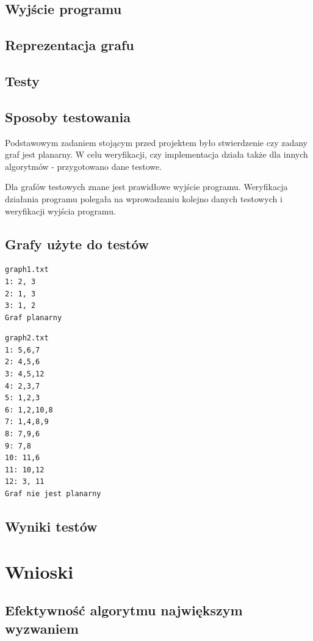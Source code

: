 \documentclass[a4 122pt]{article}
\begin{document}
	\subsection{Wyjście programu}

	\subsection{Reprezentacja grafu}

\subsection{Testy}

	\subsection{Sposoby testowania}

		Podstawowym zadaniem stojącym przed projektem było stwierdzenie czy zadany graf jest planarny.
		W celu weryfikacji, czy implementacja działa także dla innych algorytmów - przygotowano dane testowe.
		
		Dla grafów testowych znane jest prawidłowe wyjście programu. Weryfikacja działania programu polegała na wprowadzaniu kolejno danych testowych i weryfikacji wyjścia programu.		

	\subsection{Grafy użyte do testów}

\begin{verbatim}
graph1.txt
1: 2, 3
2: 1, 3
3: 1, 2
Graf planarny
\end{verbatim}

\begin{verbatim}
graph2.txt
1: 5,6,7
2: 4,5,6
3: 4,5,12
4: 2,3,7
5: 1,2,3
6: 1,2,10,8
7: 1,4,8,9
8: 7,9,6
9: 7,8
10: 11,6
11: 10,12
12: 3, 11
Graf nie jest planarny
\end{verbatim}
	\subsection{Wyniki testów}

\section{Wnioski}

	\subsection{Efektywność algorytmu największym wyzwaniem}
\end{document}
